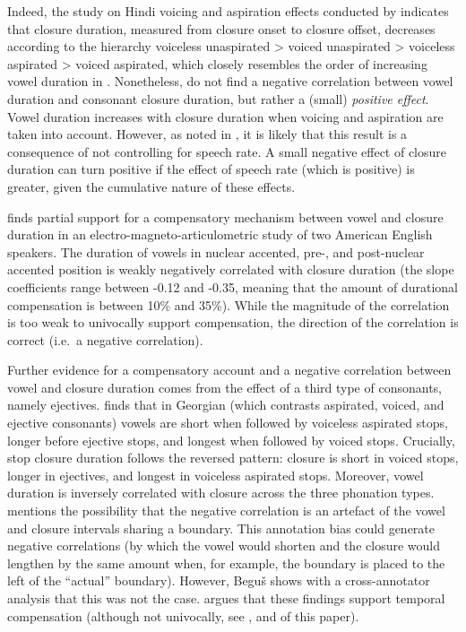 \documentclass[charis]{glossa}
\begin{document}
Indeed, the study on Hindi voicing and aspiration effects conducted by
\citet{durvasula2012} indicates that closure duration, measured from
closure onset to closure offset, decreases according to the hierarchy
voiceless unaspirated \textgreater{} voiced unaspirated \textgreater{}
voiceless aspirated \textgreater{} voiced aspirated, which closely
resembles the order of increasing vowel duration in
\citet{maddieson1976}. Nonetheless, \citet{durvasula2012} do not find a
negative correlation between vowel duration and consonant closure
duration, but rather a (small) \emph{positive effect}. Vowel duration
increases with closure duration when voicing and aspiration are taken
into account. However, as noted in \citet{begus2017}, it is likely that
this result is a consequence of not controlling for speech rate. A small
negative effect of closure duration can turn positive if the effect of
speech rate (which is positive) is greater, given the cumulative nature
of these effects.

\citet{de-jong1991} finds partial support for a compensatory mechanism
between vowel and closure duration in an electro-magneto-articulometric
study of two American English speakers. The duration of vowels in
nuclear accented, pre-, and post-nuclear accented position is weakly
negatively correlated with closure duration (the slope coefficients
range between -0.12 and -0.35, meaning that the amount of durational
compensation is between 10\% and 35\%). While the magnitude of the
correlation is too weak to univocally support compensation, the
direction of the correlation is correct (i.e.~a negative correlation).

Further evidence for a compensatory account and a negative correlation
between vowel and closure duration comes from the effect of a third type
of consonants, namely ejectives. \citet{begus2017} finds that in
Georgian (which contrasts aspirated, voiced, and ejective consonants)
vowels are short when followed by voiceless aspirated stops, longer
before ejective stops, and longest when followed by voiced stops.
Crucially, stop closure duration follows the reversed pattern: closure
is short in voiced stops, longer in ejectives, and longest in voiceless
aspirated stops. Moreover, vowel duration is inversely correlated with
closure across the three phonation types. \citet{begus2017} mentions the
possibility that the negative correlation is an artefact of the vowel
and closure intervals sharing a boundary. This annotation bias could
generate negative correlations (by which the vowel would shorten and the
closure would lengthen by the same amount when, for example, the
boundary is placed to the left of the ``actual'' boundary). However,
Beguš shows with a cross-annotator analysis that this was not the case.
\citet{begus2017} argues that these findings support temporal
compensation (although not univocally, see
\citealt[Section V]{begus2017}, and  of this paper).
\end{document}

